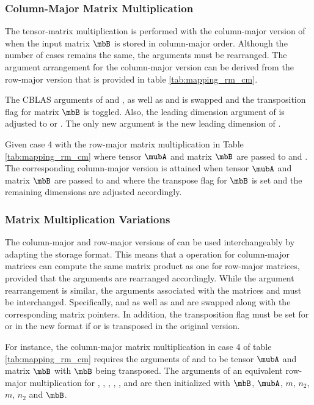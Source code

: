 \subsubsection{Column-Major Matrix Multiplication}
The tensor-matrix multiplication is performed with the column-major version of  when the input matrix $\mbB$ is stored in column-major order.
Although the number of  cases remains the same, the  arguments must be rearranged.
The argument arrangement for the column-major version can be derived from the row-major version that is provided in table \ref{tab:mapping_rm_cm}.

The CBLAS arguments of  and , as well as  and  is swapped and the transposition flag for matrix $\mbB$ is toggled.
Also, the leading dimension argument of  is adjusted to  or .
The only new argument is the new leading dimension of .

Given case 4 with the row-major matrix multiplication in Table \ref{tab:mapping_rm_cm} where tensor $\mubA$ and matrix $\mbB$ are passed to  and .
The corresponding column-major version is attained when tensor $\mubA$ and matrix $\mbB$ are passed to  and  where the transpose flag for $\mbB$ is set and the remaining dimensions are adjusted accordingly.


\subsubsection{Matrix Multiplication Variations}
The column-major and row-major versions of  can be used interchangeably by adapting the storage format. 
This means that a  operation for column-major matrices can compute the same matrix product as one for row-major matrices, provided that the arguments are rearranged accordingly.
While the argument rearrangement is similar, the arguments associated with the matrices  and  must be interchanged.
Specifically,  and  as well as  and  are swapped along with the corresponding matrix pointers.
In addition, the transposition flag must be set for  or  in the new format if  or  is transposed in the original version.

For instance, the column-major matrix multiplication in case 4 of table \ref{tab:mapping_rm_cm} requires the arguments of  and  to be tensor $\mubA$ and matrix $\mbB$ with $\mbB$ being transposed.
The arguments of an equivalent row-major multiplication for , , , , ,  and  are then initialized with $\mbB$, $\mubA$, $m$, $n_2$, $m$, $n_2$ and $\mbB$.

